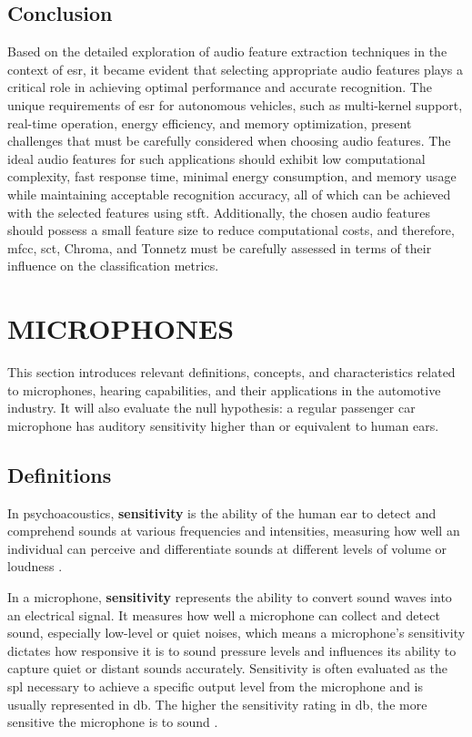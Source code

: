\subsection{Conclusion}
\label{subsec:audio_fundamentals_conclusion}

Based on the detailed exploration of audio feature extraction techniques in the context of \gls{esr}, it became evident that selecting appropriate audio features plays a critical role in achieving optimal performance and accurate recognition. The unique requirements of \gls{esr} for autonomous vehicles, such as multi-kernel support, real-time operation, energy efficiency, and memory optimization, present challenges that must be carefully considered when choosing audio features. The ideal audio features for such applications should exhibit low computational complexity, fast response time, minimal energy consumption, and memory usage while maintaining acceptable recognition accuracy, all of which can be achieved with the selected features using \gls{stft}. Additionally, the chosen audio features should possess a small feature size to reduce computational costs, and therefore, \gls{mfcc}, \gls{sct}, Chroma, and Tonnetz must be carefully assessed in terms of their influence on the classification metrics.


\section{MICROPHONES}
\label{sec:frmwk_microphones}

This section introduces relevant definitions, concepts, and characteristics related to microphones, hearing capabilities, and their applications in the automotive industry. It will also evaluate the null hypothesis: a regular passenger car microphone has auditory sensitivity higher than or equivalent to human ears.


\subsection{Definitions}
\label{subsec:microphones_definitions}

In psychoacoustics, \textbf{sensitivity} is the ability of the human ear to detect and comprehend sounds at various frequencies and intensities, measuring how well an individual can perceive and differentiate sounds at different levels of volume or loudness \cite{Moore2013}.

In a microphone, \textbf{sensitivity} represents the ability to convert sound waves into an electrical signal. It measures how well a microphone can collect and detect sound, especially low-level or quiet noises, which means a microphone's sensitivity dictates how responsive it is to sound pressure levels and influences its ability to capture quiet or distant sounds accurately. Sensitivity is often evaluated as the \gls{spl} necessary to achieve a specific output level from the microphone and is usually represented in \gls{db}. The higher the sensitivity rating in \gls{db}, the more sensitive the microphone is to sound \cite{Rayburn2004}.

